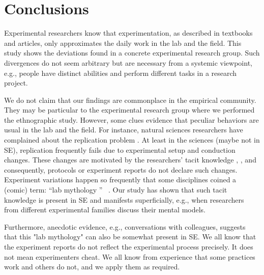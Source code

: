 \section{Conclusions}\label{sec-conclusions}
Experimental researchers know that experimentation, as described in textbooks and articles, only approximates the daily work in the lab and the field. This study shows the deviations found in a concrete experimental research group. Such divergences do not seem arbitrary but are necessary from a systemic viewpoint, e.g., people have distinct abilities and perform different tasks in a research project.

We do not claim that our findings are commonplace in the empirical community. They may be particular to the experimental research group where we performed the ethnographic study. However, some clues evidence that peculiar behaviors are usual in the lab and the field. For instance, natural sciences researchers have complained about the replication problem \cite{hines2014sorting}. At least in the sciences (maybe not in SE), replication frequently fails due to experimental setup and conduction changes. These changes are motivated by the researchers' tacit knowledge \cite{Polanyi-1996-tacit-k}, \cite{Shull-2002-replicating-SE-experiments-tacit-k}, and consequently, protocols or experiment reports do not declare such changes. Experiment variations happen so frequently that some disciplines coined a (comic) term: \textquotedblleft lab mythology \textquotedblright~\cite{ruben2011experimental} \cite{loukides2015beyond}. Our study has shown that such tacit knowledge is present in SE and manifests superficially, e.g., when researchers from different experimental families discuss their mental models.

Furthermore, anecdotic evidence, e.g., conversations with colleagues, suggests that this "lab mythology" can also be somewhat present in SE. We all know that the experiment reports do not reflect the experimental process precisely. It does not mean experimenters cheat. We all know from experience that some practices work and others do not, and we apply them as required.


